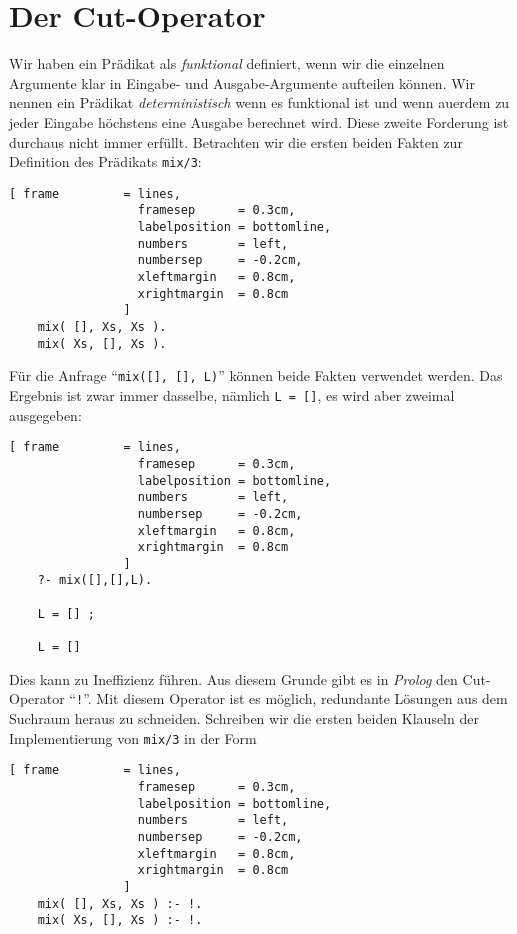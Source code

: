 \section{Der Cut-Operator}
Wir haben ein Pr\"{a}dikat als \emph{funktional} definiert,
wenn wir die einzelnen Argumente klar in Eingabe- und Ausgabe-Argumente
aufteilen k\"{o}nnen.  Wir nennen ein Pr\"{a}dikat \emph{deterministisch} wenn es funktional ist
und wenn au\3erdem zu jeder Eingabe h\"{o}chstens eine Ausgabe berechnet
wird.  Diese zweite Forderung ist durchaus nicht immer erf\"{u}llt.  Betrachten wir die ersten
beiden Fakten zur Definition des Pr\"{a}dikats \texttt{mix/3}:
\begin{Verbatim}[ frame         = lines, 
                  framesep      = 0.3cm, 
                  labelposition = bottomline,
                  numbers       = left,
                  numbersep     = -0.2cm,
                  xleftmargin   = 0.8cm,
                  xrightmargin  = 0.8cm
                ]
    mix( [], Xs, Xs ).    
    mix( Xs, [], Xs ).
\end{Verbatim}
F\"{u}r die Anfrage ``\texttt{mix([], [], L)}'' k\"{o}nnen beide Fakten verwendet werden.
Das Ergebnis ist zwar immer dasselbe, n\"{a}mlich \texttt{L = []}, es wird aber zweimal ausgegeben:
\begin{Verbatim}[ frame         = lines, 
                  framesep      = 0.3cm, 
                  labelposition = bottomline,
                  numbers       = left,
                  numbersep     = -0.2cm,
                  xleftmargin   = 0.8cm,
                  xrightmargin  = 0.8cm
                ]
    ?- mix([],[],L).
    
    L = [] ;
    
    L = [] 
\end{Verbatim}
Dies kann zu Ineffizienz f\"{u}hren.  Aus diesem Grunde gibt es in \textsl{Prolog} den
Cut-Operator ``\texttt{!}''.  Mit diesem Operator ist es m\"{o}glich, redundante L\"{o}sungen aus
dem Suchraum heraus zu schneiden.  Schreiben wir die ersten beiden Klauseln der
Implementierung von \texttt{mix/3} in der Form 
\begin{Verbatim}[ frame         = lines, 
                  framesep      = 0.3cm, 
                  labelposition = bottomline,
                  numbers       = left,
                  numbersep     = -0.2cm,
                  xleftmargin   = 0.8cm,
                  xrightmargin  = 0.8cm
                ]
    mix( [], Xs, Xs ) :- !.
    mix( Xs, [], Xs ) :- !.
\end{Verbatim}
